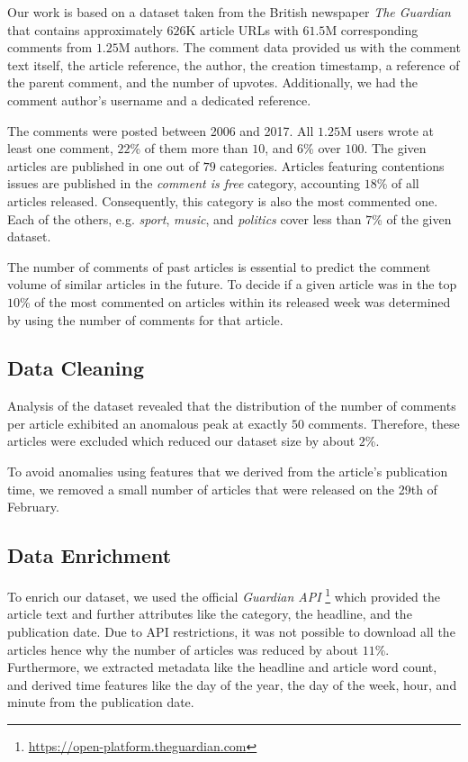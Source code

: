 Our work is based on a dataset taken from the British newspaper \textit{The Guardian} that contains approximately $626$K article URLs with $61.5$M corresponding comments from $1.25$M authors.
The comment data provided us with the comment text itself, the article reference, the author, the creation timestamp, a reference of the parent comment, and the number of upvotes. Additionally, we had the comment author's username and a dedicated reference.

The comments were posted between 2006 and 2017. All $1.25$M users wrote at least one comment, $22$\% of them more than $10$, and $6$\% over $100$.
The given articles are published in one out of $79$ categories. 
Articles featuring contentions issues are published in the \textit{comment is free} category, accounting $18$\%  of all articles released.
Consequently, this category is also the most commented one. 
Each of the others, e.g. \textit{sport}, \textit{music}, and \textit{politics} cover less than $7$\% of the given dataset.

The number of comments of past articles is essential to predict the comment volume of similar articles in the future. 
To decide if a given article was in the top $10$\% of the most commented on articles within its released week was determined by using the number of comments for that article.

\subsection{Data Cleaning}
Analysis of the dataset revealed that the distribution of the number of comments per article exhibited an anomalous peak at exactly $50$ comments. 
Therefore, these articles were excluded which reduced our dataset size by about $2$\%.

To avoid anomalies using features that we derived from the article's publication time, we removed a small number of articles that were released on the 29th of February.

\subsection{Data Enrichment}
To enrich our dataset, we used the official \textit{Guardian API} \footnote{\url{https://open-platform.theguardian.com}} which provided the article text and further attributes like the category, the headline, and the publication date.
Due to API restrictions, it was not possible to download all the articles hence why the number of articles was reduced by about $11$\%.
Furthermore, we extracted metadata like the headline and article word count, and derived time features like the day of the year, the day of the week, hour, and minute from the publication date.

